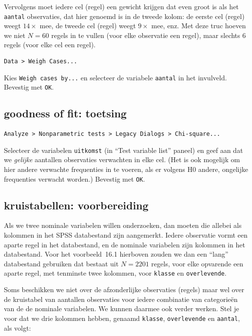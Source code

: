 \documentclass[
]{book}
\begin{document}
Vervolgens moet iedere cel (regel) een gewicht krijgen dat even groot is
als het \texttt{aantal} observaties, dat hier genoemd is in de tweede kolom: de
eerste cel (regel) weegt \(14\times\) mee, de tweede cel (regel) weegt
\(9\times\) mee, enz. Met deze truc hoeven we niet \(N=60\) regels in te
vullen (voor elke observatie een regel), maar slechts 6 regels (voor
elke cel een regel).

\begin{verbatim}
Data > Weigh Cases... 
\end{verbatim}

Kies \texttt{Weigh\ cases\ by...} en selecteer de variabele \texttt{aantal} in
het invulveld. Bevestig met \texttt{OK}.

\hypertarget{goodness-of-fit-toetsing}{%
\subsection{goodness of fit: toetsing}\label{goodness-of-fit-toetsing}}

\begin{verbatim}
Analyze > Nonparametric tests > Legacy Dialogs > Chi-square...
\end{verbatim}

Selecteer de variabelen \texttt{uitkomst} (in ``Test variable list'' paneel) en
geef aan dat we \emph{gelijke} aantallen observaties verwachten in elke cel.
(Het is ook mogelijk om hier andere verwachte frequenties in te voeren,
als er volgens H0 andere, ongelijke frequenties verwacht worden.)
Bevestig met \texttt{OK}.

\hypertarget{kruistabellen-voorbereiding}{%
\subsection{kruistabellen: voorbereiding}\label{kruistabellen-voorbereiding}}

Als we twee nominale variabelen willen onderzoeken, dan moeten die
allebei als kolommen in het SPSS databestand zijn aangemerkt. Iedere
observatie vormt een aparte regel in het databestand, en de nominale
variabelen zijn kolommen in het databestand. Voor het
voorbeeld~16.1 hierboven zouden we dan een ``lang'' databestand
gebruiken dat bestaat uit \(N=2201\) regels, voor elke opvarende een
aparte regel, met tenminste twee kolommen, voor \texttt{klasse} en
\texttt{overlevende}.

Soms beschikken we niet over de afzonderlijke observaties (regels) maar
wel over de kruistabel van aantallen observaties voor iedere combinatie
van categorieën van de de nominale variabelen. We kunnen daarmee ook
verder werken. Stel je voor dat we drie kolommen hebben, genaamd
\texttt{klasse}, \texttt{overlevende} en \texttt{aantal}, als volgt:
\end{document}
